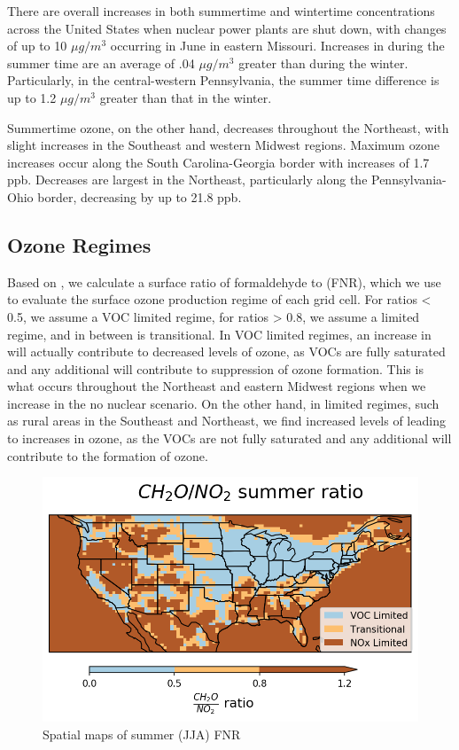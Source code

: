 \documentclass[12]{article}
\begin{document}
There are overall increases in both summertime and wintertime  concentrations across the United States when nuclear power plants are shut down, with changes of up to 10 $\mu g/m^3$ occurring in June in eastern Missouri. Increases in  during the summer time are an average of .04 $\mu g/m^3$ greater than during the winter. Particularly, in the central-western Pennsylvania, the summer time  difference is up to 1.2 $\mu g/m^3$ greater than that in the winter. 

Summertime ozone, on the other hand, decreases throughout the Northeast, with slight increases in the Southeast and western Midwest regions. Maximum ozone increases occur along the South Carolina-Georgia border with increases of 1.7 ppb. Decreases are largest in the Northeast, particularly along the Pennsylvania-Ohio border, decreasing by up to 21.8 ppb. 

\subsection{Ozone Regimes}
Based on \cite{jin_evaluating_2017}, we calculate a surface ratio of formaldehyde to  (FNR), which we use to evaluate the surface ozone production regime of each grid cell. For ratios < 0.5, we assume a VOC limited regime, for ratios > 0.8, we assume a  limited regime, and in between is transitional. In VOC limited regimes, an increase in  will actually contribute to decreased levels of ozone, as VOCs are fully saturated and any additional  will contribute to suppression of ozone formation. This is what occurs throughout the Northeast and eastern Midwest regions when we increase  in the no nuclear scenario. On the other hand, in  limited regimes, such as rural areas in the Southeast and Northeast, we find increased levels of  leading to increases in ozone, as the VOCs are not fully saturated and any additional  will contribute to the formation of ozone.  

\begin{figure}
    \centering
    \includegraphics[scale=0.4]{ego_nonuclear_project/Figures/summer_regime_national_ratio.png}
    \caption{Spatial maps of summer (JJA) FNR} 
    \label{fig:summer_FNR}
\end{figure}
\end{document}
